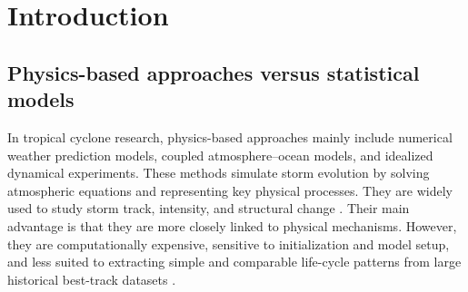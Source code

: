 \documentclass{article}
\begin{document}

\begin{abstract}
This study develops a functional data analysis framework to investigate typhoon intensity trajectories using 1,101 storms. By constructing a one-dimensional intensity index from wind speed and central pressure, each storm is represented as a smooth intensity curve over its normalized lifetime. Functional Principal Component Analysis (FPCA) reveals that over 90\% of the trajectory variance can be explained by three dominant modes: overall intensity magnitude, timing shift of the intensity peak, and high-frequency oscillation. Function-on-scalar regression further demonstrates that climatic and geographic factors systematically shift these patterns; for instance, storms originating farther east and south tend to maintain higher overall intensity, while season strongly dictates the timing of the peak. Finally, concurrent functional regression uncovers a highly time-dependent spatial-intensity relationship. During the mid-life development stage, northward displacement is associated with storm intensification, whereas in later stages both eastward and northward displacement are associated with weaker intensity.
\end{abstract}


\section{Introduction}
\subsection{Physics-based approaches versus statistical models}

In tropical cyclone research, physics-based approaches mainly include numerical weather prediction models, coupled atmosphere–ocean models, and idealized dynamical experiments. These methods simulate storm evolution by solving atmospheric equations and representing key physical processes. They are widely used to study storm track, intensity, and structural change \cite{NOAAHAFS}. Their main advantage is that they are more closely linked to physical mechanisms. However, they are computationally expensive, sensitive to initialization and model setup, and less suited to extracting simple and comparable life-cycle patterns from large historical best-track datasets \cite{Zhang2023Review}.
\end{document}
